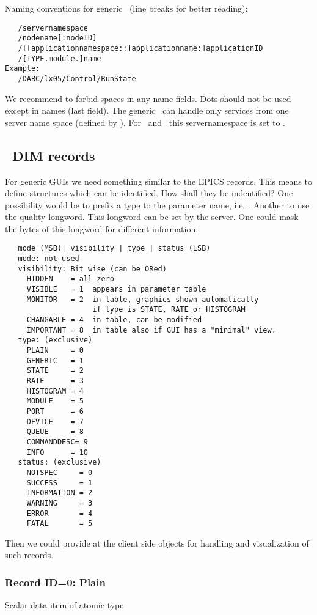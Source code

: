 Naming conventions for generic \gui\ (line breaks for better reading):
{\small \begin{verbatim}
   /servernamespace
   /nodename[:nodeID]
   /[[applicationnamespace::]applicationname:]applicationID
   /[TYPE.module.]name
Example:
   /DABC/lx05/Control/RunState
\end{verbatim}
}
We recommend to forbid spaces in any name fields. Dots should not be used except in names (last field). The generic \gui\ can handle only services from one server name space 
(defined by ). For \dabc\ and \mbs\ this servernamespace is set to .
\subsection[DABC DIM records]{\dabc\ DIM records}
For generic GUIs we need something similar to the EPICS records. This means to define structures which can be identified. How shall they be indentified? One possibility would be to prefix a type to the parameter name, i.e. . Another to use the quality longword. This longword can be set by the server. One could mask the bytes of this longword for different information:
{\small \begin{verbatim}
   mode (MSB)| visibility | type | status (LSB)
   mode: not used
   visibility: Bit wise (can be ORed)
     HIDDEN    = all zero
     VISIBLE   = 1  appears in parameter table
     MONITOR   = 2  in table, graphics shown automatically 
                    if type is STATE, RATE or HISTOGRAM
     CHANGABLE = 4  in table, can be modified
     IMPORTANT = 8  in table also if GUI has a "minimal" view.
   type: (exclusive)
     PLAIN     = 0
     GENERIC   = 1
     STATE     = 2
     RATE      = 3
     HISTOGRAM = 4
     MODULE    = 5
     PORT      = 6
     DEVICE    = 7
     QUEUE     = 8
     COMMANDDESC= 9
     INFO      = 10
   status: (exclusive) 
     NOTSPEC     = 0
     SUCCESS     = 1
     INFORMATION = 2
     WARNING     = 3
     ERROR       = 4
     FATAL       = 5
\end{verbatim}
}

Then we could provide at the client side objects for handling and visualization of such records.

\subsubsection{Record ID=0: Plain}

Scalar data item of atomic type

